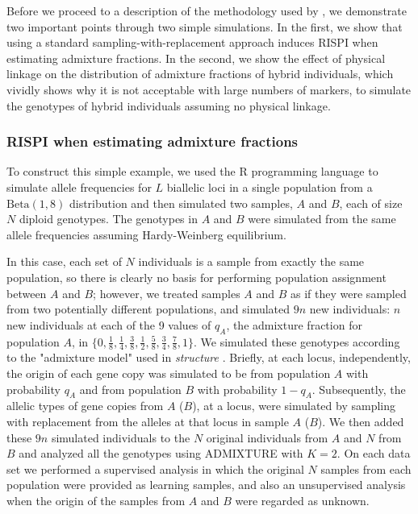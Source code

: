 Before we proceed to a description of the methodology used by \gscramble{},
we demonstrate two important points through two simple simulations.  In the first,
we show that using a standard sampling-with-replacement
approach induces RISPI when estimating admixture fractions. In the second, we show
the effect of physical linkage on the distribution of admixture fractions of hybrid individuals,
which vividly shows why it is not acceptable with large numbers of markers, to simulate
the genotypes of hybrid individuals assuming no physical linkage.


\subsubsection*{RISPI when estimating admixture fractions}

To construct this simple example, we used the R programming language \citep{Rcoreteam} to
simulate allele frequencies for $L$ biallelic
loci in a single population from a $\mathrm{Beta}(1, 8)$ distribution and then simulated
two samples, $A$ and $B$, each of size $N$ diploid genotypes. The genotypes in $A$ and $B$ were simulated
from the same allele frequencies assuming Hardy-Weinberg equilibrium.

In this case,
each set of $N$ individuals is a sample from exactly the same population, so
there is clearly no basis for performing population assignment between $A$ and $B$;
however, we treated samples $A$ and $B$ as if they were sampled from two potentially different
populations, and simulated $9n$ new individuals: $n$ new individuals at each of the 9 values of
$q_A$, the admixture fraction for population $A$, in  $\{0, \frac{1}{8}, \frac{1}{4}, \frac{3}{8}, \frac{1}{2}, \frac{5}{8}, \frac{3}{4}, \frac{7}{8}, 1\}$.
We simulated these genotypes according to the "admixture model" used in {\em structure} \citep{pritchard2000inference}.  Briefly, at each
locus, independently, the origin
of each gene copy was simulated to be from
population $A$ with probability $q_A$ and from population $B$ with probability $1-q_A$.  Subsequently,
the allelic types of gene copies from $A$ ($B$), at a locus, were simulated by sampling with replacement
from the alleles at that locus in sample $A$ ($B$).
We then added these $9n$ simulated individuals to the $N$ original individuals  from $A$ and $N$ from $B$
and analyzed all the genotypes using ADMIXTURE with $K=2$. On each data set we performed a supervised analysis in which the original
$N$ samples from each
population were provided as learning samples, and also an
unsupervised analysis when the origin of the samples from $A$ and $B$ were regarded as unknown.

